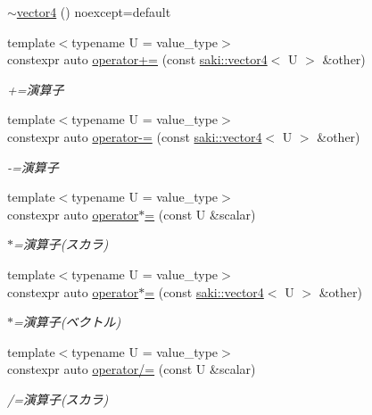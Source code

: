 \begin{DoxyCompactItemize}
\item 
\mbox{\hyperlink{classsaki_1_1vector4_ad73b902c393f8a7271b491734369ba97}{$\sim$vector4}} () noexcept=default
\item 
{\footnotesize template$<$typename U  = value\+\_\+type$>$ }\\constexpr auto \mbox{\hyperlink{classsaki_1_1vector4_a2109bee349eec6cba816718ecae33070}{operator+=}} (const \mbox{\hyperlink{classsaki_1_1vector4}{saki\+::vector4}}$<$ U $>$ \&other)
\begin{DoxyCompactList}\small\item\em +=演算子 \end{DoxyCompactList}\item 
{\footnotesize template$<$typename U  = value\+\_\+type$>$ }\\constexpr auto \mbox{\hyperlink{classsaki_1_1vector4_ab7b3e11c18b1a5bb5f3d8a029c6d8ccf}{operator-\/=}} (const \mbox{\hyperlink{classsaki_1_1vector4}{saki\+::vector4}}$<$ U $>$ \&other)
\begin{DoxyCompactList}\small\item\em -\/=演算子 \end{DoxyCompactList}\item 
{\footnotesize template$<$typename U  = value\+\_\+type$>$ }\\constexpr auto \mbox{\hyperlink{classsaki_1_1vector4_a49e953fdbce76c145389e6f2f7b09da0}{operator$\ast$=}} (const U \&scalar)
\begin{DoxyCompactList}\small\item\em $\ast$=演算子(スカラ) \end{DoxyCompactList}\item 
{\footnotesize template$<$typename U  = value\+\_\+type$>$ }\\constexpr auto \mbox{\hyperlink{classsaki_1_1vector4_acf5408d6463791999ce594ef19c438a4}{operator$\ast$=}} (const \mbox{\hyperlink{classsaki_1_1vector4}{saki\+::vector4}}$<$ U $>$ \&other)
\begin{DoxyCompactList}\small\item\em $\ast$=演算子(ベクトル) \end{DoxyCompactList}\item 
{\footnotesize template$<$typename U  = value\+\_\+type$>$ }\\constexpr auto \mbox{\hyperlink{classsaki_1_1vector4_af16bb700b952faa321775357a7926d8b}{operator/=}} (const U \&scalar)
\begin{DoxyCompactList}\small\item\em /=演算子(スカラ) \end{DoxyCompactList}\item 

\end{DoxyCompactItemize}
